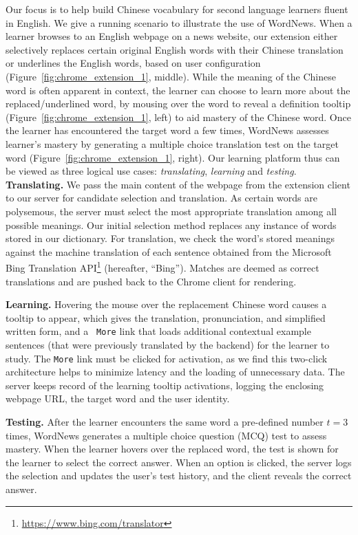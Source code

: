 \begin{CJK}{UTF8}{gbsn}
Our focus is to help build Chinese vocabulary for second language
learners fluent in English.  We give a running scenario to illustrate
the use of WordNews.  When a learner browses to an English webpage on
a news website, our extension either selectively replaces certain
original English words with their Chinese translation
or underlines the English words, based on user configuration
(Figure~\ref{fig:chrome_extension_1}, middle).  While the meaning of
the Chinese word is often apparent in context, the learner can choose
to learn more about the replaced/underlined word, by mousing over the
word to reveal a definition tooltip
(Figure~\ref{fig:chrome_extension_1}, left) to aid mastery of the
Chinese word.  Once the learner has encountered the target word a few
times, WordNews assesses learner's mastery by generating a multiple
choice translation test on the target word
(Figure~\ref{fig:chrome_extension_1}, right). Our learning platform
thus can be viewed as three logical use cases: {\it translating}, {\it
  learning} and {\it testing}. \\

{\bf Translating.}  We pass the main content of the webpage from the
extension client to our server for candidate selection and
translation.  As certain words are polysemous, the server must select
the most appropriate translation among all possible meanings. Our
initial selection method replaces any instance of words stored in our
dictionary. For translation, we check the word's stored meanings
against the machine translation of each sentence obtained from the
Microsoft Bing Translation API\footnote{\url{https://www.bing.com/translator}} 
(hereafter, ``Bing'').  Matches are
deemed as correct translations and are pushed back to the Chrome
client for rendering.

{\bf Learning.} Hovering the mouse over the replacement Chinese word
causes a tooltip to appear, which gives the translation,
pronunciation, and simplified written form, and a {\tt
  More} link that loads additional contextual example sentences (that
were previously translated by the backend) for the learner to study.
The  {\tt More}  link must be clicked for activation, as we find this
two-click architecture helps to minimize latency and the loading of
unnecessary data.  The server keeps record of the learning tooltip
activations, logging the enclosing webpage URL, the target word and
the user identity.

{\bf Testing.}  After the learner encounters the same word a
pre-defined number $t=3$ times, WordNews generates a multiple choice
question (MCQ) test to assess mastery.  When the learner hovers over
the replaced word, the test is shown for the learner to select the
correct answer. When an option is clicked, the server logs the
selection and updates the user's test history, and the client reveals
the correct answer.


\end{CJK}
